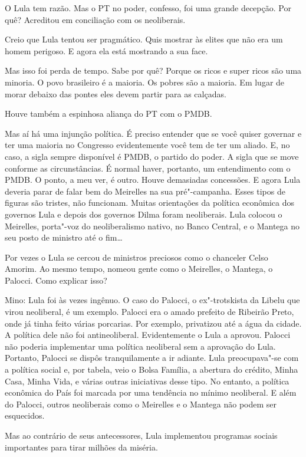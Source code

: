 \falaM O Lula tem razão. Mas o PT no poder, confesso, foi uma grande
decepção. Por quê? Acreditou em conciliação com os neoliberais.

\falaG Creio que Lula tentou ser pragmático. Quis mostrar às elites que não
era um homem perigoso. E agora ela está mostrando a sua face.

\falaM Mas isso foi perda de tempo. Sabe por quê? Porque os ricos e super
ricos são uma minoria. O povo brasileiro é a maioria. Os pobres são a
maioria. Em lugar de morar debaixo das pontes eles devem partir para as
calçadas.

\falaG Houve também a espinhosa aliança do PT com o PMDB.

\falaM Mas aí há uma injunção política. É preciso entender que se você
quiser governar e ter uma maioria no Congresso evidentemente você tem de
ter um aliado. E, no caso, a sigla sempre disponível é PMDB, o partido
do poder. A sigla que se move conforme as circunstâncias. É normal
haver, portanto, um entendimento com o PMDB. O ponto, a meu ver, é
outro. Houve demasiadas concessões. E agora Lula deveria parar de falar
bem do Meirelles na sua pré"-campanha. Esses tipos de figuras são
tristes, não funcionam. Muitas orientações da política econômica dos
governos Lula e depois dos governos Dilma foram neoliberais. Lula
colocou o Meirelles, porta"-voz do neoliberalismo nativo, no Banco
Central, e o Mantega no seu posto de ministro até o fim…

\falaG Por vezes o Lula se cercou de ministros preciosos como o chanceler
Celso Amorim. Ao mesmo tempo, nomeou gente como o Meirelles, o Mantega,
o Palocci. Como explicar isso?

Mino: Lula foi às vezes ingênuo. O caso do Palocci, o ex"-trotskista da
Libelu que virou neoliberal, é um exemplo. Palocci era o amado prefeito
de Ribeirão Preto, onde já tinha feito várias porcarias. Por exemplo,
privatizou até a água da cidade. A política dele não foi antineoliberal.
Evidentemente o Lula a aprovou. Palocci não poderia implementar uma
política neoliberal sem a aprovação do Lula. Portanto, Palocci se dispôs
tranquilamente a ir adiante. Lula preocupava"-se com a política social e,
por tabela, veio o Bolsa Família, a abertura do crédito, Minha Casa,
Minha Vida, e várias outras iniciativas desse tipo. No entanto, a
política econômica do País foi marcada por uma tendência no mínimo
neoliberal. E além do Palocci, outros neoliberais como o Meirelles e o
Mantega não podem ser esquecidos.

\falaG Mas ao contrário de seus antecessores, Lula implementou programas
sociais importantes para tirar milhões da miséria.

